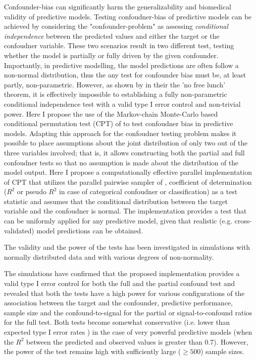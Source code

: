 \documentclass{article}
\begin{document}
Confounder-bias can significantly harm the generalizability and biomedical validity of predictive models. Testing confoudner-bias of predictive models can be achieved by considering the "confounder-problem" as assessing \emph{conditional independence} between the predicted values and either the target or the confoudner variable. These two scenarios result in two different test, testing whether the model is partially or fully driven by the given confounder.
Importantly, in predictive modelling, the model predictions are often follow a non-normal distribution, thus the any test for confounder bias must be, at least partly, non-parametric.
However, as shown by in \citet{shah2020hardness} their the 'no free lunch' theorem, it is effectively impossible to establishing a fully non-parametric conditional independence test with a valid type I error control and non-trivial power.
Here I propose the use of the Markov-chain Monte-Carlo based conditional permutation test (CPT) of \cite{berrett2020conditional} to test confoudner bias in predictive models. Adapting this approach for the confoudner testing problem makes it possible to place assumptions about the joint distribution of only two out of the three variables involved; that is, it allows constructing both the partial and full confoudner tests so that no assumption is made about the distribution of the model output. 
Here I propose a computationally effective parallel implementation of CPT that utilizes the parallel pairwise sampler of \cite{berrett2020conditional}, coefficient of determination ($R^2$ or pseudo $R^2$ in case of categorical confoudner or classification) as a test statistic and assumes that the conditional distribution between the target variable and the confoudner is normal. The implementation provides a test that can be uniformly applied for any predictive model, given that realistic (e.g. cross-validated) model predictions can be obtained.

The validity and the power of the tests has been investigated in simulations with normally distributed data and with various degrees of non-normality.

The simulations have confirmed that the proposed implementation provides a valid type I error control for both the full and the partial confound test and revealed that both the tests have a high power for various configurations of the association between the target and the confounder, predictive performance, sample size and the confound-to-signal for the partial or signal-to-confound ratios for the full test. 
Both tests become somewhat conservative (i.e. lower than expected type I error rates ) in the case of very powerful predictive models (when the $R^2$ between the predicted and observed values is greater than 0.7). However, the power of the test remains high with sufficiently large ($\ge 500$) sample sizes.
\end{document}
